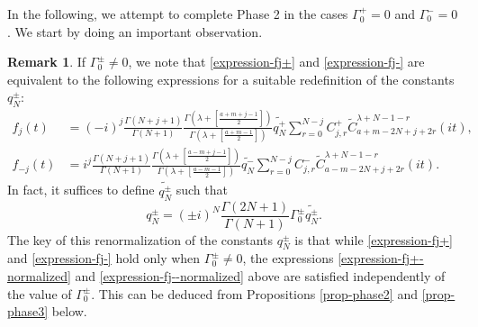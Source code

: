 \documentclass[12pt, pdflatex, a4paper]{article}
\theoremstyle{plain}
\theoremstyle{definition}
\newtheorem{rem}[thm]{Remark}
\def\Geg{\widetilde{C}}
\begin{document}
In the following, we attempt to complete Phase 2 in the cases $\Gamma_0^+ = 0$ and $\Gamma_0^- = 0$. We start by doing an important observation.
\begin{rem}\label{rem-normalization-fj+-} 
If $\Gamma_0^\pm \neq 0$, we note that \eqref{expression-fj+} and \eqref{expression-fj-} are equivalent to the following expressions for a suitable redefinition of the constants $q_N^\pm$:
\begin{align}\label{expression-fj+-normalized}
f_j(t) &= (-i)^j\frac{\Gamma(N+j+1)}{\Gamma(N+1)}\frac{\Gamma\left(\lambda+\left[\frac{a+m+j-1}{2}\right]\right)}{\Gamma\left(\lambda+\left[\frac{a+m-1}{2}\right]\right)}\widetilde{q_N^+}\sum_{r=0}^{N-j}C_{j,r}^+\Geg_{a+m-2N+j+2r}^{\lambda+N-1-r}(it),\\
\label{expression-fj--normalized}
f_{-j}(t) &= i^j\frac{\Gamma(N+j+1)}{\Gamma(N+1)}\frac{\Gamma\left(\lambda+\left[\frac{a-m+j-1}{2}\right]\right)}{\Gamma\left(\lambda+\left[\frac{a-m-1}{2}\right]\right)}\widetilde{q_N^-}\sum_{r=0}^{N-j}C_{j,r}^-\Geg_{a-m-2N+j+2r}^{\lambda+N-1-r}(it).
\end{align}
In fact, it suffices to define $\widetilde{q_N^\pm}$ such that
\begin{equation*}
q_N^\pm = (\pm i)^{N}\frac{\Gamma(2N+1)}{\Gamma(N+1)}\Gamma_0^\pm\widetilde{q_N^\pm}.
\end{equation*}
The key of this renormalization of the constants $q_N^\pm$ is that while \eqref{expression-fj+} and \eqref{expression-fj-} hold only when $\Gamma_0^\pm \neq 0$, the expressions \eqref{expression-fj+-normalized} and \eqref{expression-fj--normalized} above are satisfied independently of the value of $\Gamma_0^\pm$. This can be deduced from Propositions \ref{prop-phase2} and \ref{prop-phase3} below.
\end{rem}
\end{document}
